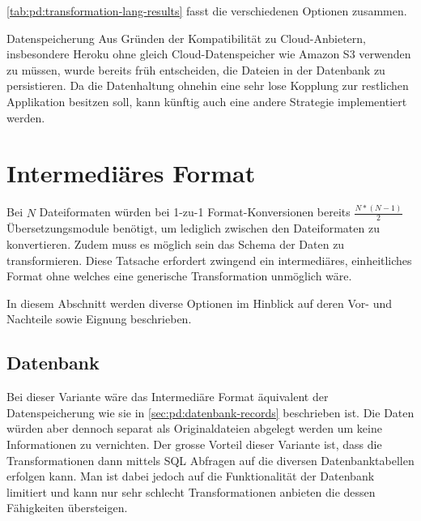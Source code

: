 \cref{tab:pd:transformation-lang-results} fasst die verschiedenen Optionen zusammen.

\begin{decision}[label=dec:pd:datenspeicherung]{Datenspeicherung}
Aus Gründen der Kompatibilität zu Cloud-Anbietern, insbesondere Heroku ohne gleich Cloud-Datenspeicher wie Amazon S3 verwenden zu müssen, wurde bereits früh entscheiden, die Dateien in der Datenbank zu persistieren. Da die Datenhaltung ohnehin eine sehr lose Kopplung zur restlichen Applikation besitzen soll, kann künftig auch eine andere Strategie implementiert werden.
\end{decision}

\section{Intermediäres Format}

Bei $N$ Dateiformaten würden bei 1-zu-1 Format-Konversionen bereits $\frac{N*(N-1)}2$ Übersetzungsmodule benötigt, um lediglich zwischen den Dateiformaten zu konvertieren. Zudem muss es möglich sein das Schema der Daten zu transformieren. Diese Tatsache erfordert zwingend ein intermediäres, einheitliches Format ohne welches eine generische Transformation unmöglich wäre.

In diesem Abschnitt werden diverse Optionen im Hinblick auf deren Vor- und Nachteile sowie Eignung beschrieben. 

\subsection{Datenbank}
Bei dieser Variante wäre das Intermediäre Format äquivalent der Datenspeicherung wie sie in \cref{sec:pd:datenbank-records} beschrieben ist. Die Daten würden aber dennoch separat als Originaldateien abgelegt werden um keine Informationen zu vernichten. Der grosse Vorteil dieser Variante ist, dass die Transformationen dann mittels SQL Abfragen auf die diversen Datenbanktabellen erfolgen kann. Man ist dabei jedoch auf die Funktionalität der Datenbank limitiert und kann nur sehr schlecht Transformationen anbieten die dessen Fähigkeiten übersteigen.

